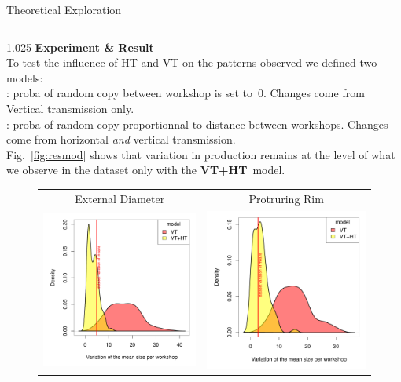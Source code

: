 \documentclass[final]{beamer}
\newlength{\onecolwid}
\newlength{\twocolwid}
\begin{document}
\begin{frame}[t]
\begin{columns}[t]
\begin{column}{\twocolwid}
\begin{block}{Theoretical Exploration}
\begin{columns}[t,totalwidth=\twocolwid]
\begin{column}{1.025\onecolwid} %
{\textbf{Experiment \& Result}}\\
\justify
To test the influence of HT and VT on the patterns observed we defined two models:\\
: proba of random copy between workshop is set to~$0$. Changes come from Vertical transmission only.\\
: proba of random copy proportionnal to distance between workshops. Changes come from horizontal \emph{and} vertical transmission.\\
Fig.~\ref{fig:resmod} shows that variation in production remains at the level of what we observe in the dataset only with the {\footnotesize\textbf{VT+HT}}~model.
    \begin{figure}[h!]
	\begin{tabular}{cc}
	    \centering
	    \small   External Diameter & \small Protruring Rim\\
	    \includegraphics[width=0.5\linewidth]{images/ED_densities.pdf}&
	    \includegraphics[width=0.5\linewidth]{images/PR_densities.pdf}\\

\end{tabular}
\end{figure}
\end{column}
\end{columns}
\end{block}
\end{column}
\end{columns}
\end{frame}
\end{document}
